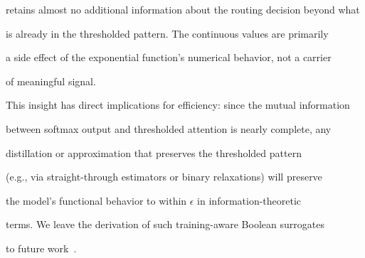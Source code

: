 retains almost no additional information about the routing decision beyond what






is already in the thresholded pattern. The continuous values are primarily






a side effect of the exponential function's numerical behavior, not a carrier






of meaningful signal.













This insight has direct implications for efficiency: since the mutual information






between softmax output and thresholded attention is nearly complete, any






distillation or approximation that preserves the thresholded pattern






(e.g., via straight-through estimators or binary relaxations) will preserve






the model's functional behavior to within $\epsilon$ in information-theoretic






terms. We leave the derivation of such training-aware Boolean surrogates






to future work~\cite{parr2026boole,skw2026open}.



















